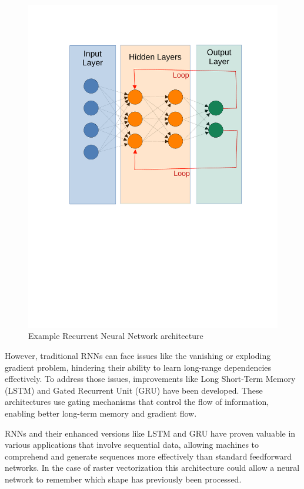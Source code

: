 \documentclass[12pt, a4paper, titlepage]{report}
\begin{document}
\begin{figure}
	\centering
	\includegraphics[width=1.0\textwidth]{../rc/images/rnn_architecture.pdf}
   \caption{Example Recurrent Neural Network architecture \cite{img_rnn_architecture}}
	\label{fig:rnn_architecture}
\end{figure}

However, traditional RNNs can face issues like the vanishing or exploding gradient problem, hindering their ability to learn long-range dependencies effectively.
To address those issues, improvements like Long Short-Term Memory (LSTM) and Gated Recurrent Unit (GRU) have been developed. These architectures use gating mechanisms that control the flow of information, enabling better long-term memory and gradient flow.

RNNs and their enhanced versions like LSTM and GRU have proven valuable in various applications that involve sequential data, allowing machines to comprehend and generate sequences more effectively than standard feedforward networks. In the case of raster vectorization this architecture could allow a neural network to remember which shape has previously been processed.
\end{document}
